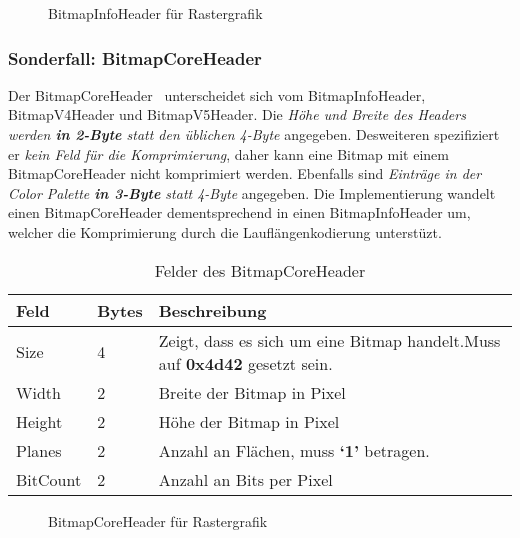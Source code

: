 \documentclass[course=erap]{aspdoc}
\newcommand{\hexdump}[2]{
 \begin{figure}[H]
   \small
   
   \vspace*{-5mm}
   \caption{#2}
 \end{figure}
}
\begin{document}
\hexdump{res/example_28_5x5_infoheader.txt}{BitmapInfoHeader für Rastergrafik}

\subsubsection{Sonderfall: BitmapCoreHeader}
Der BitmapCoreHeader~\cite{bitmapCoreHeader} unterscheidet sich vom BitmapInfoHeader, BitmapV4Header und BitmapV5Header. Die \textit{Höhe und Breite des Headers werden \textbf{in 2-Byte} statt den üblichen 4-Byte} angegeben. Desweiteren spezifiziert er \textit{kein Feld für die Komprimierung}, daher kann eine Bitmap mit einem BitmapCoreHeader nicht komprimiert werden. Ebenfalls sind \textit{Einträge in der Color Palette \textbf{in 3-Byte} statt 4-Byte} angegeben.
\newline 
Die Implementierung wandelt einen BitmapCoreHeader dementsprechend in einen BitmapInfoHeader um, welcher die Komprimierung durch die Lauflängenkodierung unterstüzt.
\newline

\begin{table}[h!]
\begin{tabular}{ |p{6em}|p{3em}|p{25.75em}|  }
    \hline
    \textbf{Feld} & \textbf{Bytes} & \textbf{Beschreibung} \\
    \hline
    Size & 4 & Zeigt, dass es sich um eine Bitmap handelt.\newline Muss auf \textbf{0x4d42} gesetzt sein. \\ \hline
    Width & 2 & Breite der Bitmap in Pixel \\
    \hline
    Height & 2 & Höhe der Bitmap in Pixel \\
    \hline
    Planes & 2 & Anzahl an Flächen, muss \textbf{`1'} betragen. \\
    \hline
    BitCount & 2 & Anzahl an Bits per Pixel \\
    \hline
\end{tabular}
\caption{Felder des BitmapCoreHeader}
\end{table}

\hexdump{res/example_0C_5x5_infoheader.txt}{BitmapCoreHeader für Rastergrafik}
\end{document}

